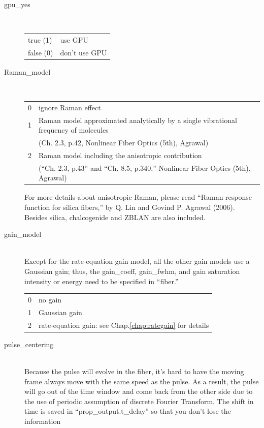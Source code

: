 \documentclass[12pt,hidelinks]{book}
\begin{document}
\begin{description}
\item[\color{blue}gpu\_yes]\mbox{}\\
\begin{tabular}{ll}
true (1) & use GPU \\
false (0) & don't use GPU
\end{tabular}

\item[\color{blue}Raman\_model]\mbox{}\\
\begin{tabular}[t]{ll}
0 & ignore Raman effect \\
1 & Raman model approximated analytically by a single vibrational frequency of molecules\\
& (Ch. 2.3, p.42, Nonlinear Fiber Optics (5th), Agrawal) \\
2 & Raman model including the anisotropic contribution \\
& (``Ch. 2.3, p.43'' and ``Ch. 8.5, p.340,'' Nonlinear Fiber Optics (5th), Agrawal)
\end{tabular}

For more details about anisotropic Raman, please read ``Raman response function for silica fibers,'' by Q. Lin and Govind P. Agrawal (2006). Besides silica, chalcogenide and ZBLAN are also included.

\item[\color{blue}gain\_model]\mbox{}\\
Except for the rate-equation gain model, all the other gain models use a Gaussian gain; thus, the gain\_coeff, gain\_fwhm, and gain saturation intensity or energy need to be specified in ``fiber.''

\begin{tabular}{ll}
0 & no gain \\
1 & Gaussian gain \\
2 & rate-equation gain: see Chap.\ref{chap:rategain} for details
\end{tabular}

\item[\color{blue}pulse\_centering]\mbox{}\\
Because the pulse will evolve in the fiber, it's hard to have the moving frame always move with the same speed as the pulse. As a result, the pulse will go out of the time window and come back from the other side due to the use of periodic assumption of discrete Fourier Transform. The shift in time is saved in ``prop\_output.t\_delay'' so that you don't lose the information


\end{description}
\end{document}
